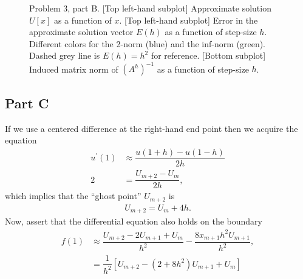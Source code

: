 \documentclass[12pt]{article}
\begin{document}
\begin{figure}[!h]
	\caption{
		Problem 3, part B. [Top left-hand subplot] Approximate solution $U[x]$ as a function of $x$. [Top left-hand subplot] Error in the approximate solution vector $E(h)$ as a function of step-size $h$. Different colors for the 2-norm (blue) and the inf-norm (green). Dashed grey line is $E(h) = h^{2}$ for reference. [Bottom subplot] Induced matrix norm of $(A^{h})^{-1}$ as a function of step-size $h$.
	}
\end{figure}


\FloatBarrier

\subsection*{Part C}

If we use a centered difference at the right-hand end point then we acquire the equation
\begin{subequations}
    \begin{align}
        u^{\prime}(1) &\approx \dfrac{u(1+h)-u(1-h)}{2h}\\
        2 &= \dfrac{U_{m+2}-U_{m}}{2h},
    \end{align}
\end{subequations}
which implies that the ``ghost point'' $U_{m+2}$ is
\begin{align}
    U_{m+2} = U_{m} + 4h.
\end{align}
Now, assert that the differential equation also holds on the boundary
\begin{subequations}
    \begin{align}
        f(1) &\approx  \dfrac{U_{m+2}-2U_{m+1}+U_{m}}{h^{2}} - \dfrac{8x_{m+1}h^{2}U_{m+1}}{h^{2}},\\
        &= \dfrac{1}{h^{2}}\left[U_{m+2}-(2+8h^{2})U_{m+1}+U_{m}\right]
    \end{align}
\end{subequations}
\end{document}
